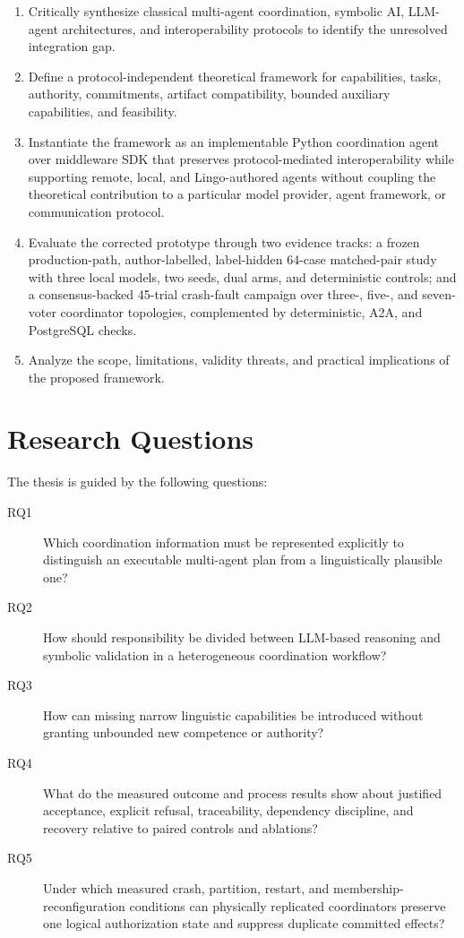 \begin{enumerate}
  \item Critically synthesize classical multi-agent coordination, symbolic AI, LLM-agent architectures, and interoperability protocols to identify the unresolved integration gap.
  \item Define a protocol-independent theoretical framework for capabilities, tasks, authority, commitments, artifact compatibility, bounded auxiliary capabilities, and feasibility.
  \item Instantiate the framework as an implementable Python coordination agent over middleware SDK that preserves protocol-mediated interoperability while supporting remote, local, and Lingo-authored agents without coupling the theoretical contribution to a particular model provider, agent framework, or communication protocol.
  \item Evaluate the corrected prototype through two evidence tracks: a frozen production-path, author-labelled, label-hidden 64-case matched-pair study with three local models, two seeds, dual arms, and deterministic controls; and a consensus-backed 45-trial crash-fault campaign over three-, five-, and seven-voter coordinator topologies, complemented by deterministic, A2A, and PostgreSQL checks.
  \item Analyze the scope, limitations, validity threats, and practical implications of the proposed framework.
\end{enumerate}

\section{Research Questions}

The thesis is guided by the following questions:

\begin{description}
  \item[RQ1] Which coordination information must be represented explicitly to distinguish an executable multi-agent plan from a linguistically plausible one?
  \item[RQ2] How should responsibility be divided between LLM-based reasoning and symbolic validation in a heterogeneous coordination workflow?
  \item[RQ3] How can missing narrow linguistic capabilities be introduced without granting unbounded new competence or authority?
  \item[RQ4] What do the measured outcome and process results show about justified acceptance, explicit refusal, traceability, dependency discipline, and recovery relative to paired controls and ablations?
  \item[RQ5] Under which measured crash, partition, restart, and membership-reconfiguration conditions can physically replicated coordinators preserve one logical authorization state and suppress duplicate committed effects?
\end{description}

